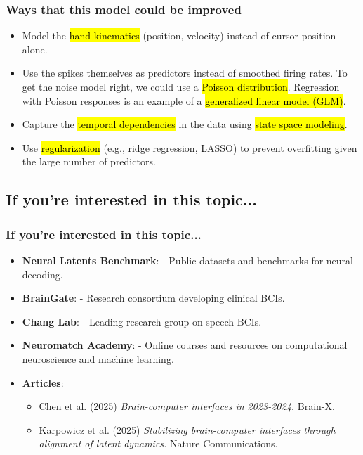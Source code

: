 \documentclass[slidestop,compress,mathserif]{beamer}
\begin{document}

\begin{frame}
\frametitle{Ways that this model could be improved}

\begin{itemize}
    \item Model the \hl{hand kinematics} (position, velocity) instead of cursor position alone.\pause
    \item Use the spikes themselves as predictors instead of smoothed firing rates. To get the noise model right, we could use a \hl{Poisson distribution}. Regression with Poisson responses is an example of a \hl{generalized linear model (GLM)}.\pause
    \item Capture the \hl{temporal dependencies} in the data using \hl{state space modeling}.\pause
    \item Use \hl{regularization} (e.g., ridge regression, LASSO) to prevent overfitting given the large number of predictors.
\end{itemize}
\end{frame}


\subsection{If you're interested in this topic...}


\begin{frame}
\frametitle{If you're interested in this topic...}

\begin{itemize}
    \item \textbf{Neural Latents Benchmark}:  - Public datasets and benchmarks for neural decoding.
    \item \textbf{BrainGate}:  - Research consortium developing clinical BCIs.
    \item \textbf{Chang Lab}:  - Leading research group on speech BCIs.
    \item \textbf{Neuromatch Academy}:  - Online courses and resources on computational neuroscience and machine learning.
    \item \textbf{Articles}:
    \begin{itemize}
        \item Chen et al. (2025) \textit{Brain-computer interfaces in 2023-2024.} Brain-X. 
        \item Karpowicz et al. (2025) \textit{Stabilizing brain-computer interfaces through alignment of latent dynamics.} Nature Communications. 
    \end{itemize}
\end{itemize}
\end{frame}


\end{document}
